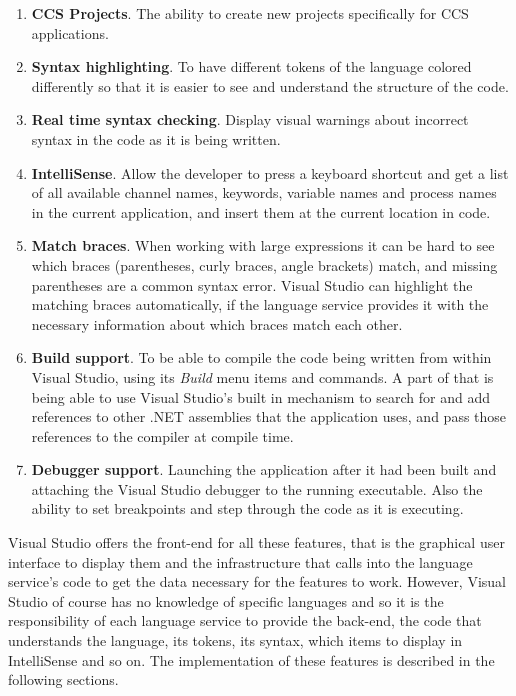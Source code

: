 	\begin{enumerate}
		\item \textbf{CCS Projects}. The ability to create new projects 
		specifically for CCS applications.

		\item \textbf{Syntax highlighting}. To have different tokens of the 
		language colored differently so that it is easier to see and understand 
		the structure of the code.
		
		\item \textbf{Real time syntax checking}. Display visual warnings about 
		incorrect syntax in the code as it is being written. 
	
		\item \textbf{IntelliSense}. Allow the developer to press a keyboard 
		shortcut and get a list of all available channel names, keywords, variable 
		names and process names in the current application, and insert them at the 
		current location in code. 
		
		\item \textbf{Match braces}. When working with large expressions it 
		can be hard to see which braces (parentheses, curly braces, angle 
		brackets) match, and missing parentheses are a common syntax error. Visual 
		Studio can highlight the matching braces automatically, if the language
		service provides it with the necessary information about which braces 
		match each other.
		
		\item \textbf{Build support}. To be able to compile the code being written 
		from within Visual Studio, using its \textit{Build} menu items and 
		commands. A part of that is being able to use Visual Studio's built in 
		mechanism to search for and add references to other .NET assemblies that 
		the application uses, and pass those references to the compiler at compile 
		time.
		
		\item \textbf{Debugger support}. Launching the application after it had 
		been built and attaching the Visual Studio debugger to the running 
		executable. Also the ability to set breakpoints and step through the code 
		as it is executing.
		
	\end{enumerate}
	
	Visual Studio offers the front-end for all these features, that is the 
	graphical user interface to display them and the infrastructure that calls 
	into the language service's code to get the data necessary for the features 
	to work. However, Visual Studio of course has no knowledge of specific 
	languages and so it is the responsibility of each language service to 
	provide the back-end, the code that understands the language, its tokens, 
	its syntax, which items to display in IntelliSense and so on. The 
	implementation of these features is described in the following sections.
	
